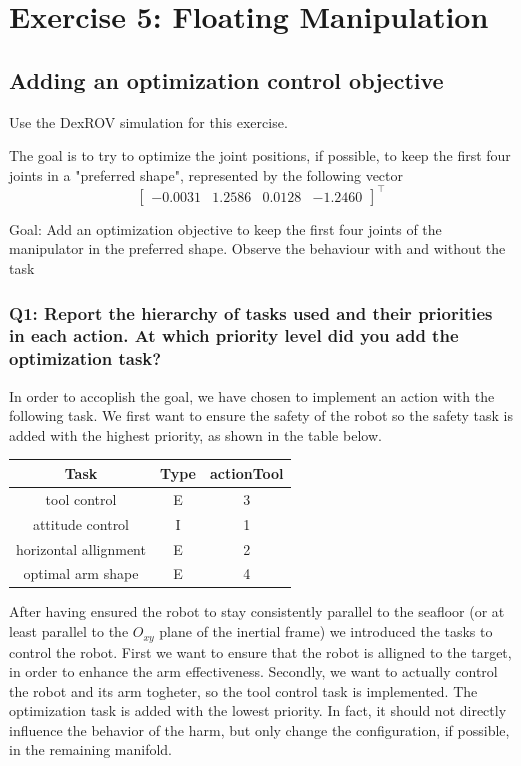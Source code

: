 \documentclass{article}
\begin{document}
\section{Exercise 5: Floating Manipulation}
\subsection{Adding an optimization control objective}
Use the DexROV simulation for this exercise.

The goal is to try to optimize the joint positions, if possible, to keep the first four joints in a "preferred shape", represented by the following vector
\begin{displaymath}
\begin{bmatrix}-0.0031 & 1.2586 & 0.0128 & -1.2460 \end{bmatrix}^\top
\end{displaymath}

Goal: Add an optimization objective to keep the first four joints of the manipulator in the preferred shape. Observe the behaviour with and without the task

\subsubsection{Q1: Report the hierarchy of tasks used and their priorities in each action. At which priority level did you add the optimization task?}

In order to accoplish the goal, we have chosen to implement an action with the following task. We first want to ensure the safety of the robot so the safety task is added with the highest priority, as shown in the table below. 

\begin{tabular}{ccc}
	\toprule
	Task & Type & actionTool	\\
	\midrule
	tool control                    & E & 3  \\
	\hdashline
	attitude control                & I & 1  \\
	\hdashline
	horizontal allignment           & E & 2  \\
	\hdashline
	optimal arm shape				& E & 4  \\
	\bottomrule
\end{tabular}

After having ensured the robot to stay consistently parallel to the seafloor (or at least parallel to the $ O_{xy} $ plane of the inertial frame) we introduced the tasks to control the robot. First we want to ensure that the robot is alligned to the target, in order to enhance the arm effectiveness. Secondly, we want to actually control the robot and its arm togheter, so the tool control task is implemented. The optimization task is added with the lowest priority. In fact, it should not directly influence the behavior of the harm, but only change the configuration, if possible, in the remaining manifold. 
\end{document}
